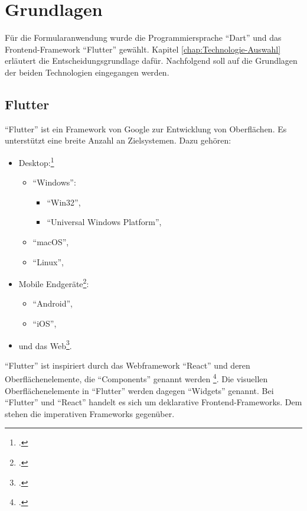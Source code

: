 \chapter{Grundlagen}
\label{chap:Grundlagen}

Für die Formularanwendung wurde die Programmiersprache \enquote{Dart} und das Frontend-Frame\-work \enquote{Flutter} gewählt.
Kapitel \ref{chap:Technologie-Auswahl} erläutert die Entscheidungsgrundlage dafür.
Nachfolgend soll auf die Grundlagen der beiden Technologien eingegangen werden.

\section{Flutter}
\label{sec:Flutter-Grundlagen}

\enquote{Flutter} ist ein Framework von Google zur Entwicklung von Oberflächen.
Es unterstützt eine breite Anzahl an Zielsystemen.
 Dazu gehören:

\begin{itemize}[topsep=0pt,itemsep=-1ex,partopsep=1ex,parsep=1ex]
  \item Desktop:\footcite[Vgl.][]{DesktopSupportForFlutter}
        \begin{itemize}
          \item \enquote{Windows}:
                \begin{itemize}
                  \item \enquote{Win32},
                  \item \enquote{Universal Windows Platform},
                \end{itemize}
          \item \enquote{macOS},
          \item \enquote{Linux},
        \end{itemize}
  \item Mobile Endgeräte\footcite[Vgl.][]{FlutterBeautifulNativeAppsInRecordTime}:
        \begin{itemize}
          \item \enquote{Android},
          \item \enquote{iOS},
        \end{itemize}
  \item und das Web\footcite[Vgl.][]{WebSupportForFlutter}.
\end{itemize}

\enquote{Flutter} ist inspiriert durch das Webframework \enquote{React} und deren Oberflächenelemente, die \enquote{Components} genannt werden \footcite[Vgl.][]{IntroductionToWidgets}.
Die visuellen Oberflächenelemente in \enquote{Flutter} werden dagegen \enquote{Widgets} genannt.
Bei \enquote{Flutter} und \enquote{React} handelt es sich um deklarative Frontend-Frameworks.
Dem stehen die imperativen Frameworks gegenüber.

